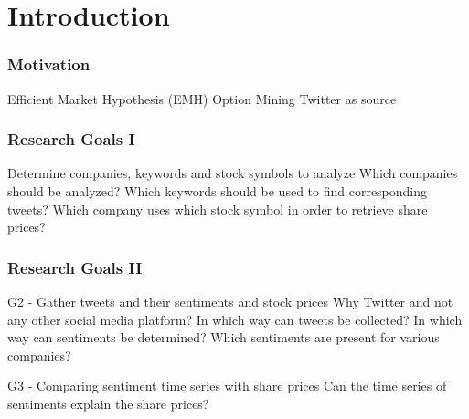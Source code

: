 
\section{Introduction}
 
\begin{frame}
    \frametitle{Motivation}
    
    \begin{outline}
        \1 Efficient Market Hypothesis (EMH)
        \1 Option Mining
        \1 Twitter as source
    \end{outline}
\end{frame}

\begin{frame}
    \frametitle{Research Goals I}
    
    \begin{outline}
        \1 Determine companies, keywords and stock symbols to analyze
            \2 Which companies should be analyzed?
            \2 Which keywords should be used to find corresponding tweets?
            \2 Which company uses which stock symbol in order to retrieve share prices?
    \end{outline}
\end{frame}

\begin{frame}
    \frametitle{Research Goals II}
    
    \begin{outline}

    \1 G2 - Gather tweets and their sentiments and stock prices
        \2 Why Twitter and not any other social media platform?
        \2 In which way can tweets be collected?
        \2 In which way can sentiments be determined?
        \2 Which sentiments are present for various companies?

    \1 G3 - Comparing sentiment time series with share prices
        \2 Can the time series of sentiments explain the share prices?

    \end{outline}
\end{frame}